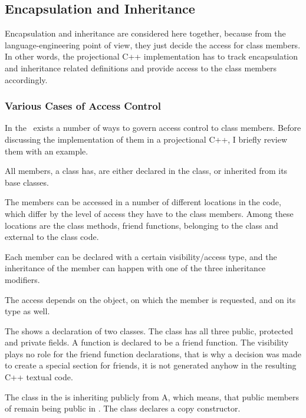 \subsection{Encapsulation and Inheritance}


Encapsulation and inheritance are considered here together, because from the language-engineering point of view, 
they just decide the access for class members. In other words, the projectional C++ implementation has to track
encapsulation and inheritance related definitions and provide access to the class members accordingly.


\subsubsection{Various Cases of Access Control}

In the \cpppl\ exists a number of ways to govern access control to class members. Before discussing 
the implementation of them in a projectional C++, I briefly review them with an example.

All members, a class has, are either declared in the class, or inherited from its base classes. 

The members can be accessed in a number of different locations in the code, which differ by the level of access they have
to the class members. Among these locations are the class methods, friend functions, belonging to the class and
external to the class code. 

Each member can be declared with a certain visibility/access type, and the inheritance
of the member can happen with one of the three inheritance modifiers. 

The access depends on the object, on which the member is requested, and on its type as well.


The  shows a declaration of two classes. The class  has all three
public, protected and private fields. A function  is declared to be a
friend function. The visibility plays no role for the friend function declarations, 
that is why a decision was made to create a special section for friends, it is not 
generated anyhow in the resulting C++ textual code.

The class  in the  is inheriting publicly from A, which means,
that public members of  remain being public in . The class  declares
a copy constructor.

